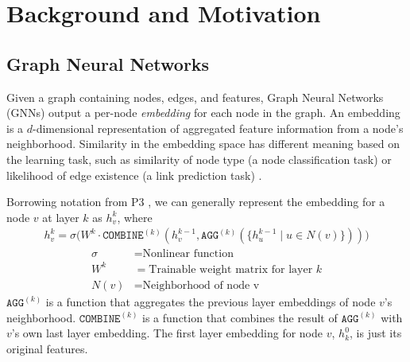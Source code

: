 \chapter{Background and Motivation}

\section{Graph Neural Networks}
Given a graph containing nodes, edges, and features, Graph Neural Networks (GNNs) output a per-node \textit{embedding} for each node in the graph.
An embedding is a $d$-dimensional representation of aggregated feature information from a node's neighborhood. 
Similarity in the embedding space has different meaning based on the learning task, such as similarity of node type (a node classification task) \cite{GCN_2016} or likelihood of edge existence (a link prediction task) \cite{LinkPredictionGNN_2018}. 


Borrowing notation from P3 \cite{P3_2021}, we can generally represent the embedding for a node $v$ at layer $k$ as $h_v^k$, where
\begin{align} \label{GNN Equation}
    h_v^k = \sigma \biggl(
         W^k \cdot 
         \mathtt{COMBINE}^{(k)} \left(
            h_v^{k-1},
            \mathtt{AGG}^{(k)} \left( 
                    \{ h_u^{k-1} \mid u \in N(v) \}
                \right) 
         \right)
     \biggl)
\end{align}
\begin{align*}
    \sigma &= \text{Nonlinear function} \\
    W^k &= \text{Trainable weight matrix for layer $k$} \\
    N(v) &= \text{Neighborhood of node v}
\end{align*}
$\mathtt{AGG}^{(k)}$ is a function that aggregates the previous layer embeddings of node $v$'s neighborhood. 
$\mathtt{COMBINE}^{(k)}$ is a function that combines the result of $\mathtt{AGG}^{(k)}$ with $v$'s own last layer embedding. 
The first layer embedding for node $v$, $h_k^0$, is just its original features.

